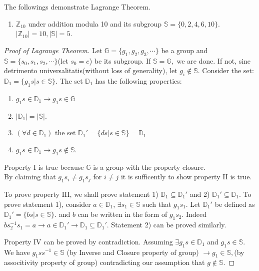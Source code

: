 \documentclass[../note.tex]{subfiles}
\begin{document}
\begin{example}
	The followings demonstrate Lagrange Theorem.
	\begin{enumerate}
		\item $\mathbb{Z}_{10}$ under addition modula 10 and its subgroup $\mathbb{S} = \{0,2,4,6,10\}$. 
		$|\mathbb{Z}_{10}|=10, |\mathbb{S}|=5$.  
	\end{enumerate}
\end{example}
\begin{proof}[Proof of Lagrange Theorem]
	Let $\mathbb{G}=\{g_1, g_2, g_3, \cdots \}$ be a group and $\mathbb{S}= \{s_0, s_1, s_2, \cdots\}$(let $s_0=e$) be its subgroup. 
	If $\mathbb{S}=\mathbb{G},$ we are done. If not, sine detrimento universalitatis(without loss of generality), let  $g_i \notin \mathbb{S}$. 
	Consider the set: $\mathbb{D}_1=\{g_1s|s \in \mathbb{S}\}$. The set $\mathbb{D}_1$ has the following properties:
	\begin{enumerate}
		\item $g_1s \in \mathbb{D}_1 \rightarrow g_1s \in \mathbb{G}$ 
		\item $|\mathbb{D}_1| = |\mathbb{S}|$. 
		\item $(\forall d \in \mathbb{D}_1)$ the set $\mathbb{D}_1'=\{ds|s\in \mathbb{S}\}=\mathbb{D}_1$
		\item $g_1s \in \mathbb{D}_1 \rightarrow g_1s \notin \mathbb{S}.$ 
	\end{enumerate}
	Property I is true because $\mathbb{G}$ is a group with the property closure.\\
	By claiming that $g_1s_i \neq g_1s_j$ for $i \neq j$ it is sufficently to show property II is true.
	
	To prove property III, we shall prove statement 1) $\mathbb{D}_1\subseteq \mathbb{D}_1'$ and 2) $\mathbb{D}_1'\subseteq \mathbb{D}_1$.
	To prove statement 1), consider $a\in \mathbb{D}_1$, $\exists s_1 \in \mathbb{S}$ such that $g_1s_1$. 
	Let $\mathbb{D}_1'$ be defined as $\mathbb{D}_1'=\{bs|s\in \mathbb{S}\}$. 
	and $b$ can be written in the form of $g_1s_2$. 
	Indeed $bs_2^{-1}s_1=a \rightarrow a\in \mathbb{D}_1' \rightarrow \mathbb{D}_1 \subseteq \mathbb{D}_1'.$ Statement 2) can be proved similarly.

	Property IV can be proved by contradiction. Assuming $\exists g_1s \in \mathbb{D}_1$ and $ g_1s \in \mathbb{S}.$ 
	We have $g_1ss^{-1} \in \mathbb{S}$ (by Inverse and Closure property of group) $\rightarrow g_1 \in \mathbb{S},$(by associtivity property of group) contradicting our assumption that $g \notin \mathbb{S}$.


\end{proof}
\end{document}
